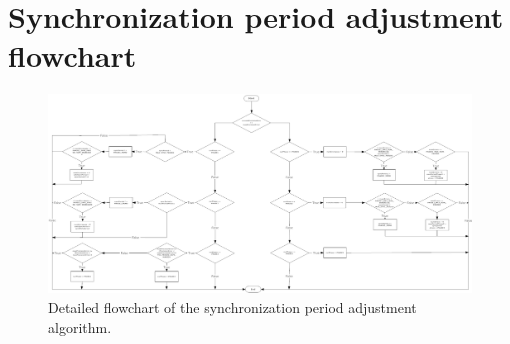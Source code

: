 \chapter{Synchronization period adjustment flowchart}

\begin{figure}[!htb]
\begin{center}
\includegraphics[scale=0.4,angle=90]{./images/26-ttsp-flowchart.png}
\end{center}
\caption{Detailed flowchart of the synchronization period adjustment algorithm.}
\label{flow}
\end{figure}